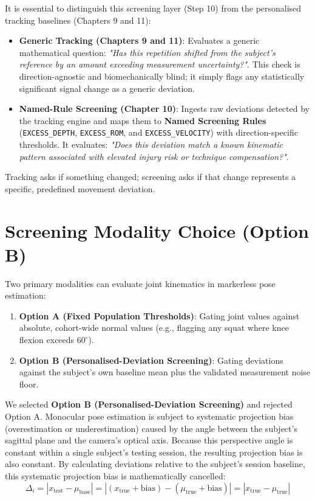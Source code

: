 It is essential to distinguish this screening layer (Step 10) from the personalised tracking baselines (Chapters 9 and 11):
\begin{itemize}
  \item \textbf{Generic Tracking (Chapters 9 and 11)}: Evaluates a generic mathematical question: \textit{"Has this repetition shifted from the subject's reference by an amount exceeding measurement uncertainty?"}. This check is direction-agnostic and biomechanically blind; it simply flags any statistically significant signal change as a generic deviation.
  \item \textbf{Named-Rule Screening (Chapter 10)}: Ingests raw deviations detected by the tracking engine and maps them to \textbf{Named Screening Rules} (\texttt{EXCESS\_DEPTH}, \texttt{EXCESS\_ROM}, and \texttt{EXCESS\_VELOCITY}) with direction-specific thresholds. It evaluates: \textit{"Does this deviation match a known kinematic pattern associated with elevated injury risk or technique compensation?"}.
\end{itemize}

Tracking asks if something changed; screening asks if that change represents a specific, predefined movement deviation.



\section{Screening Modality Choice (Option B)}
\label{sec:10-3-screening-modality-choice-option-b}


Two primary modalities can evaluate joint kinematics in markerless pose estimation:
\begin{enumerate}
  \item \textbf{Option A (Fixed Population Thresholds)}: Gating joint values against absolute, cohort-wide normal values (e.g., flagging any squat where knee flexion exceeds $60^\circ$).
  \item \textbf{Option B (Personalised-Deviation Screening)}: Gating deviations against the subject's own baseline mean plus the validated measurement noise floor.
\end{enumerate}

We selected \textbf{Option B (Personalised-Deviation Screening)} and rejected Option A. Monocular pose estimation is subject to systematic projection bias (overestimation or underestimation) caused by the angle between the subject's sagittal plane and the camera's optical axis. Because this perspective angle is constant within a single subject's testing session, the resulting projection bias is also constant. By calculating deviations relative to the subject's session baseline, this systematic projection bias is mathematically cancelled:
\begin{equation}
  \Delta_i = |x_{\text{test}} - \mu_{\text{base}}| = |(x_{\text{true}} + \text{bias}) - (\mu_{\text{true}} + \text{bias})| = |x_{\text{true}} - \mu_{\text{true}}|
  \label{eq:disp1}
\end{equation}

